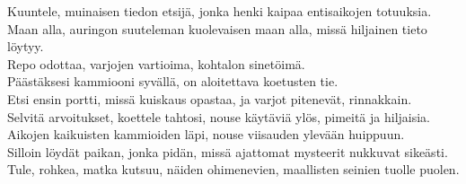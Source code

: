 \documentclass{article}
\begin{document}
\begin{infobox}
Kuuntele, muinaisen tiedon etsijä, jonka henki kaipaa entisaikojen totuuksia.\\
Maan alla, auringon suuteleman kuolevaisen maan alla, missä hiljainen tieto löytyy.\\
Repo odottaa, varjojen vartioima, kohtalon sinetöimä.\\
Päästäksesi kammiooni syvällä, on aloitettava koetusten tie.\\
Etsi ensin portti, missä kuiskaus opastaa, ja varjot pitenevät, rinnakkain.\\
Selvitä arvoitukset, koettele tahtosi, nouse käytäviä ylös, pimeitä ja hiljaisia.\\
Aikojen kaikuisten kammioiden läpi, nouse viisauden ylevään huippuun.\\
Silloin löydät paikan, jonka pidän, missä ajattomat mysteerit nukkuvat sikeästi.\\
Tule, rohkea, matka kutsuu, näiden ohimenevien, maallisten seinien tuolle puolen.
\end{infobox}
\end{document}
